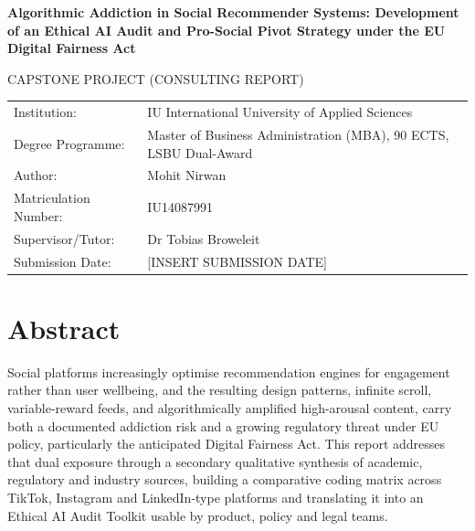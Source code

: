 \documentclass[11pt]{article}
\begin{document}
\setcounter{page}{1}
\thispagestyle{empty}
\begin{titlepage}
    \centering
    \vspace*{2cm}
    {\fontsize{16}{19}\bfseries Algorithmic Addiction in Social Recommender Systems: Development of an Ethical AI Audit and Pro-Social Pivot Strategy under the EU Digital Fairness Act\par}
    \vspace{1.5cm}
    {\large CAPSTONE PROJECT (CONSULTING REPORT)\par}
    \vspace{1cm}
    \begin{tabular}{ll}
        Institution: & IU International University of Applied Sciences \\[4pt]
        Degree Programme: & Master of Business Administration (MBA), 90 ECTS, LSBU Dual-Award \\[4pt]
        Author: & Mohit Nirwan \\[4pt]
        Matriculation Number: & IU14087991 \\[4pt]
        Supervisor/Tutor: & Dr Tobias Broweleit \\[4pt]
        Submission Date: & [INSERT SUBMISSION DATE] \\
    \end{tabular}
\end{titlepage}

\setcounter{page}{2}

\section*{Abstract}
Social platforms increasingly optimise recommendation engines for engagement rather than user wellbeing, and the resulting design patterns, infinite scroll, variable-reward feeds, and algorithmically amplified high-arousal content, carry both a documented addiction risk and a growing regulatory threat under EU policy, particularly the anticipated Digital Fairness Act. This report addresses that dual exposure through a secondary qualitative synthesis of academic, regulatory and industry sources, building a comparative coding matrix across TikTok, Instagram and LinkedIn-type platforms and translating it into an Ethical AI Audit Toolkit usable by product, policy and legal teams.
\end{document}
